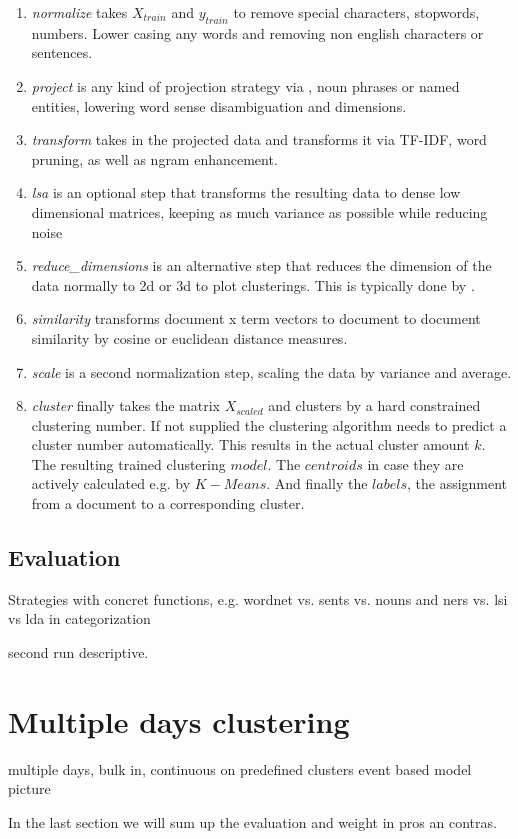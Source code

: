     \begin{enumerate}
      \item \emph{normalize} takes $X_{train}$ and $y_{train}$ to remove special characters, stopwords, numbers. Lower casing any words and removing non english characters or sentences. 
      \item \emph{project} is any kind of projection strategy via \wordnet{}, noun phrases or named entities, lowering word sense disambiguation and dimensions.
      \item \emph{transform} takes in the projected data and transforms it via TF-IDF, word pruning, as well as ngram enhancement.
      \item \emph{lsa} is an optional step that transforms the resulting data to dense low dimensional matrices, keeping as much variance as possible while reducing noise
      \item \emph{reduce\_dimensions} is an alternative step that reduces the dimension of the data normally to 2d or 3d to plot clusterings. This is typically done by \pca{}.
      \item \emph{similarity} transforms document x term vectors to document to document similarity by cosine or euclidean distance measures.
      \item \emph{scale} is a second normalization step, scaling the data by variance and average.
      \item \emph{cluster} finally takes the matrix $X_{scaled}$ and clusters by a hard constrained clustering number. If not supplied the clustering algorithm needs to predict a cluster number automatically. This results in the actual cluster amount $k$. The resulting trained clustering $model$. The $centroids$ in case they are actively calculated e.g. by $K-Means$. And finally the $labels$, the assignment from a document to a corresponding cluster.
    \end{enumerate}

  \subsection{Evaluation}
  Strategies with concret functions, e.g. wordnet vs. sents vs. nouns and ners vs. lsi vs lda in categorization

  second run descriptive.

\section{Multiple days clustering}
  
  multiple days, bulk in,
  continuous on predefined clusters
  event based model picture

In the last section we will sum up the evaluation and weight in pros an contras.

